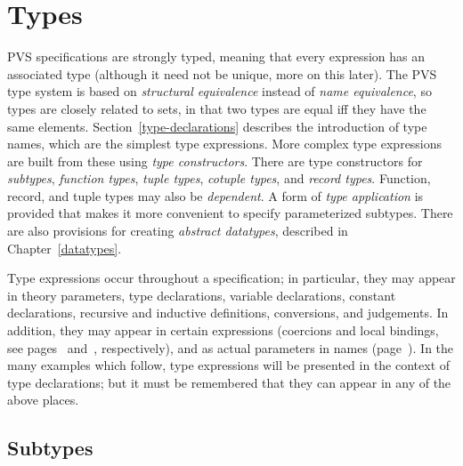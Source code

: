 
\chapter{Types}\label{types}

PVS specifications are strongly typed, meaning that every expression has
an associated type (although it need not be unique, more on this later).
The PVS type system is based on \emph{structural
equivalence} instead of \emph{name
equivalence}, so types are closely related to
sets, in that two types are equal iff they have the same elements.
Section~\ref{type-declarations} describes the introduction of type names,
which are the simplest type expressions.  More complex type
expressions are built from these using \emph{type
constructors}.  There are type constructors for
\emph{subtypes}, \emph{function
types}, \emph{tuple
types}, \emph{cotuple
types}, and \emph{record
types}.  Function, record, and
tuple types may also be \emph{dependent}.  A form of \emph{type
application} is provided
that makes it more convenient to specify parameterized subtypes.  There
are also provisions for creating \emph{abstract datatypes}, described in
Chapter~\ref{datatypes}.

Type expressions occur throughout a specification; in particular, they may
appear in theory parameters, type declarations, variable declarations,
constant declarations, recursive and inductive definitions, conversions,
and judgements.  In addition, they may appear in certain expressions
(coercions and local bindings, see pages~\pageref{coercions}
and~\pageref{binding-expressions}, respectively), and as actual parameters
in names (page~\pageref{names}).  In the many examples which follow, type
expressions will be presented in the context of type declarations; but it
must be remembered that they can appear in any of the above places.


\section{Subtypes}\label{subtypes}


